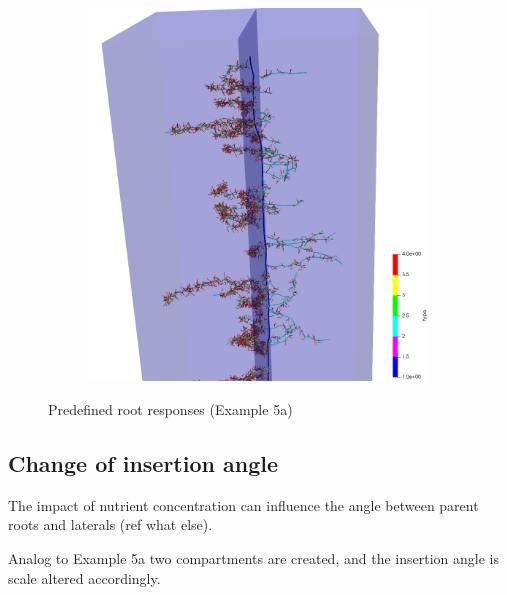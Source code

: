 \begin{figure}
\begin{subfigure}[c]{0.3\textwidth}
 \label{fig:insertion}
\end{subfigure}
\begin{subfigure}[c]{0.3\textwidth}
\includegraphics[width=0.99\textwidth]{example5d.png}
 \label{fig:probability}
\end{subfigure}
\caption{Predefined root responses (Example 5a)}
\end{figure}



\subsection{Change of insertion angle} \label{sec:insertion_angle}

The impact of nutrient concentration can influence the angle between parent roots and laterals (ref what else).

Analog to Example 5a two compartments are created, and the insertion angle is scale altered accordingly.




